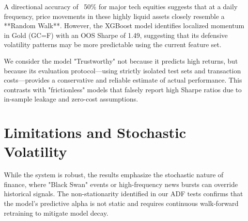 A directional accuracy of ~50\% for major tech equities suggests that at a daily frequency, price movements in these highly liquid assets closely resemble a **Random Walk**. However, the XGBoost model identifies localized momentum in Gold (GC=F) with an OOS Sharpe of 1.49, suggesting that its defensive volatility patterns may be more predictable using the current feature set.

We consider the model "Trustworthy" not because it predicts high returns, but because its evaluation protocol—using strictly isolated test sets and transaction costs—provides a conservative and reliable estimate of actual performance. This contrasts with "frictionless" models that falsely report high Sharpe ratios due to in-sample leakage and zero-cost assumptions.

\section{Limitations and Stochastic Volatility}
While the system is robust, the results emphasize the stochastic nature of finance, where "Black Swan" events or high-frequency news bursts can override historical signals. The non-stationarity identified in our ADF tests confirms that the model's predictive alpha is not static and requires continuous walk-forward retraining to mitigate model decay.
